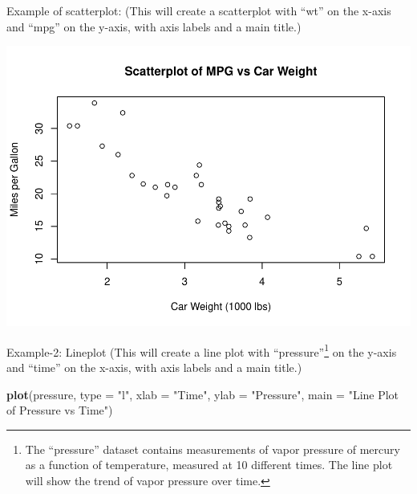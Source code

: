 \documentclass[
]{book}
\newenvironment{Shaded}{\begin{snugshade}}{\end{snugshade}}
\newcommand{\AttributeTok}[1]{\textcolor[rgb]{0.13,0.29,0.53}{#1}}
\newcommand{\FunctionTok}[1]{\textcolor[rgb]{0.13,0.29,0.53}{\textbf{#1}}}
\newcommand{\NormalTok}[1]{#1}
\newcommand{\SpecialCharTok}[1]{\textcolor[rgb]{0.81,0.36,0.00}{\textbf{#1}}}
\newcommand{\StringTok}[1]{\textcolor[rgb]{0.31,0.60,0.02}{#1}}
\begin{document}
Example of scatterplot: (This will create a scatterplot with ``wt'' on the x-axis and ``mpg'' on the y-axis, with axis labels and a main title.)

\begin{Shaded}
\end{Shaded}

\begin{center}\includegraphics[height=0.55\textheight]{DauR_files/figure-latex/p1-1} \end{center}

Example-2: Lineplot (This will create a line plot with ``pressure''\footnote{The ``pressure'' dataset contains measurements of vapor pressure of mercury as a function of temperature, measured at 10 different times. The line plot will show the trend of vapor pressure over time.} on the y-axis and ``time'' on the x-axis, with axis labels and a main title.)

\begin{Shaded}
\begin{Highlighting}[]
\FunctionTok{plot}\NormalTok{(pressure, }
     \AttributeTok{type =} \StringTok{"l"}\NormalTok{, }
     \AttributeTok{xlab =} \StringTok{"Time"}\NormalTok{, }
     \AttributeTok{ylab =} \StringTok{"Pressure"}\NormalTok{, }
     \AttributeTok{main =} \StringTok{"Line Plot of Pressure vs Time"}\NormalTok{)}
\end{Highlighting}
\end{Shaded}
\end{document}

